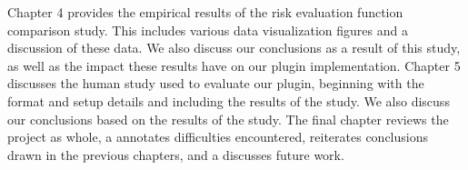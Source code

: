 Chapter 4 provides the empirical results of the risk evaluation function
comparison study.  This includes various data visualization figures and
a discussion of these data.  We also discuss our conclusions as a result
of this study, as well as the impact these results have on our plugin 
implementation.  Chapter 5 discusses the human study used to evaluate our
plugin, beginning with the format and setup details and including the results
of the study.  We also discuss our conclusions based on the results of the study.
The final chapter reviews the project as whole, a annotates difficulties 
encountered, reiterates conclusions drawn in the previous chapters, 
and a discusses future work.